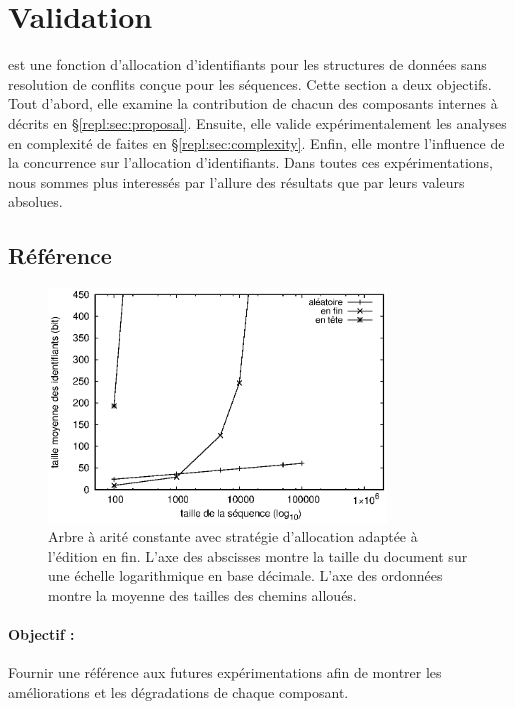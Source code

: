
\section{Validation}
\label{repl:sec:validation}

\LSEQ est une fonction d'allocation d'identifiants pour les structures de
données sans resolution de conflits conçue pour les séquences.  Cette section a
deux objectifs. Tout d'abord, elle examine la contribution de chacun des
composants internes à \LSEQ décrits en §\ref{repl:sec:proposal}.  Ensuite, elle
valide expérimentalement les analyses en complexité de \LSEQ faites en
§\ref{repl:sec:complexity}. Enfin, elle montre l'influence de la concurrence sur
l'allocation d'identifiants. Dans toutes ces expérimentations, nous sommes plus
interessés par l'allure des résultats que par leurs valeurs absolues.

\subsection{Référence}

\begin{figure}
  \begin{center}
    \includegraphics[width=0.8\textwidth]{img/lseq/logoot.eps}
    \caption[Mesures de référence de la taille des chemins]
    {\label{repl:img:logoot} Arbre à arité constante avec stratégie d'allocation
      adaptée à l'édition en fin. L'axe des abscisses montre la taille du
      document sur une échelle logarithmique en base décimale. L'axe des
      ordonnées montre la moyenne des tailles des chemins alloués.}
  \end{center}
\end{figure}


\paragraph{Objectif :} Fournir une référence aux futures expérimentations afin
de montrer les améliorations et les dégradations de chaque composant.

